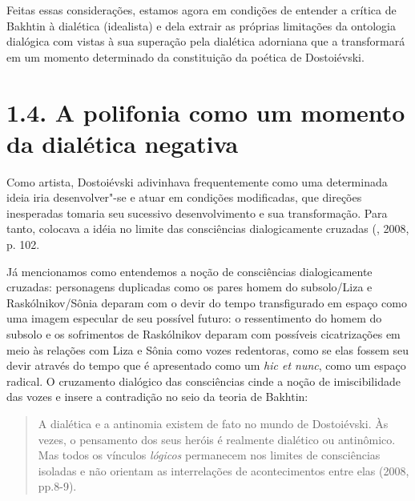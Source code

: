 {{Feitas essas considerações, estamos agora em condições de entender a
crítica de Bakhtin à dialética (idealista) e dela extrair as próprias
limitações da ontologia dialógica com vistas à sua superação pela
dialética adorniana que a transformará em um momento determinado da
constituição da poética de Dostoiévski.

\section{1.4. A polifonia como um momento da dialética negativa}

Como artista, Dostoiévski adivinhava frequentemente como uma determinada
ideia iria desenvolver"-se e atuar em condições modificadas, que direções
inesperadas tomaria seu sucessivo desenvolvimento e sua transformação.
Para tanto, colocava a idéia no limite das consciências dialogicamente
cruzadas (, 2008, p. 102.

Já mencionamos como entendemos a noção de consciências dialogicamente
cruzadas: personagens duplicadas como os pares homem do subsolo/Liza e
Raskólnikov/Sônia deparam com o devir do tempo transfigurado em espaço
como uma imagem especular de seu possível futuro: o ressentimento do
homem do subsolo e os sofrimentos de Raskólnikov deparam com possíveis
cicatrizações em meio às relações com Liza e Sônia como vozes
redentoras, como se elas fossem seu devir através do tempo que é
apresentado como um \emph{hic et nunc}, como um espaço radical. O
cruzamento dialógico das consciências cinde a noção de imiscibilidade
das vozes e insere a contradição no seio da teoria de Bakhtin:

\begin{quote}
A dialética e a antinomia existem de fato no mundo de Dostoiévski. Às
vezes, o pensamento dos seus heróis é realmente dialético ou antinômico.
Mas todos os vínculos \emph{lógicos} permanecem nos limites de
consciências isoladas e não orientam as interrelações de acontecimentos
entre elas (2008, pp.8-9).
\end{quote}

}}
